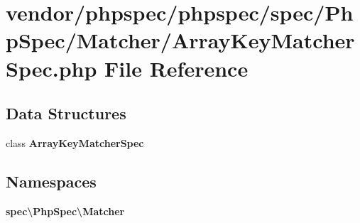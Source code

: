 \section{vendor/phpspec/phpspec/spec/\+Php\+Spec/\+Matcher/\+Array\+Key\+Matcher\+Spec.php File Reference}
\label{_array_key_matcher_spec_8php}
\subsection*{Data Structures}
\begin{DoxyCompactItemize}
\item 
class {\bf Array\+Key\+Matcher\+Spec}
\end{DoxyCompactItemize}
\subsection*{Namespaces}
\begin{DoxyCompactItemize}
\item 
 {\bf spec\textbackslash{}\+Php\+Spec\textbackslash{}\+Matcher}
\end{DoxyCompactItemize}
